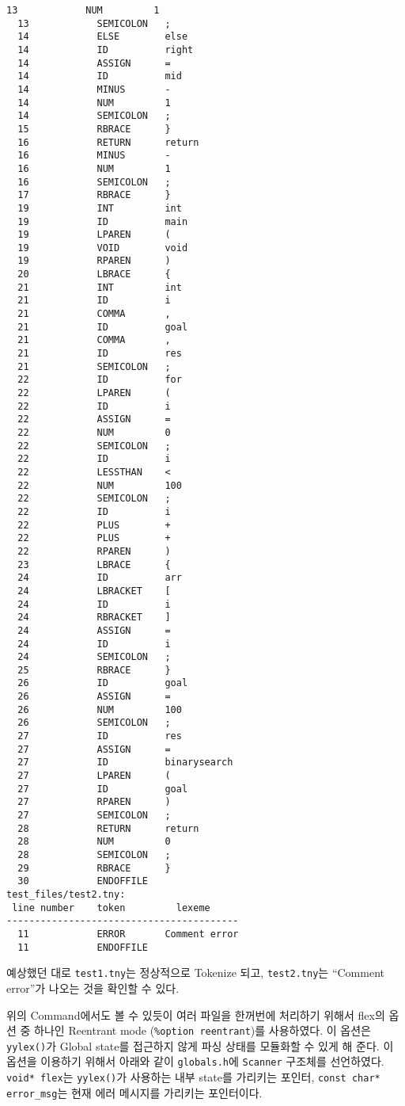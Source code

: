 \documentclass[a4paper, 10pt]{oblivoir}
\begin{document}
\begin{lstlisting}[caption=Output, frame=single]
  13            NUM         1
  13            SEMICOLON   ;
  14            ELSE        else
  14            ID          right
  14            ASSIGN      =
  14            ID          mid
  14            MINUS       -
  14            NUM         1
  14            SEMICOLON   ;
  15            RBRACE      }
  16            RETURN      return
  16            MINUS       -
  16            NUM         1
  16            SEMICOLON   ;
  17            RBRACE      }
  19            INT         int
  19            ID          main
  19            LPAREN      (
  19            VOID        void
  19            RPAREN      )
  20            LBRACE      {
  21            INT         int
  21            ID          i
  21            COMMA       ,
  21            ID          goal
  21            COMMA       ,
  21            ID          res
  21            SEMICOLON   ;
  22            ID          for
  22            LPAREN      (
  22            ID          i
  22            ASSIGN      =
  22            NUM         0
  22            SEMICOLON   ;
  22            ID          i
  22            LESSTHAN    <
  22            NUM         100
  22            SEMICOLON   ;
  22            ID          i
  22            PLUS        +
  22            PLUS        +
  22            RPAREN      )
  23            LBRACE      {
  24            ID          arr
  24            LBRACKET    [
  24            ID          i
  24            RBRACKET    ]
  24            ASSIGN      =
  24            ID          i
  24            SEMICOLON   ;
  25            RBRACE      }
  26            ID          goal
  26            ASSIGN      =
  26            NUM         100
  26            SEMICOLON   ;
  27            ID          res
  27            ASSIGN      =
  27            ID          binarysearch
  27            LPAREN      (
  27            ID          goal
  27            RPAREN      )
  27            SEMICOLON   ;
  28            RETURN      return
  28            NUM         0
  28            SEMICOLON   ;
  29            RBRACE      }
  30            ENDOFFILE   
test_files/test2.tny:
 line number    token         lexeme    
-----------------------------------------
  11            ERROR       Comment error
  11            ENDOFFILE
\end{lstlisting}

예상했던 대로 \texttt{test1.tny}는 정상적으로 Tokenize 되고, \texttt{test2.tny}는 ``Comment error''가 나오는 것을 확인할 수 있다.

위의 Command에서도 볼 수 있듯이 여러 파일을 한꺼번에 처리하기 위해서 flex의 옵션 중 하나인 Reentrant mode (\texttt{\%option reentrant})를 사용하였다. 이 옵션은 \texttt{yylex()}가 Global state를 접근하지 않게 파싱 상태를 모듈화할 수 있게 해 준다. 이 옵션을 이용하기 위해서 아래와 같이 \texttt{globals.h}에 \texttt{Scanner} 구조체를 선언하였다. \texttt{void* flex}는 \texttt{yylex()}가 사용하는 내부 state를 가리키는 포인터, \texttt{const char* error\_msg}는 현재 에러 메시지를 가리키는 포인터이다.
\end{document}
